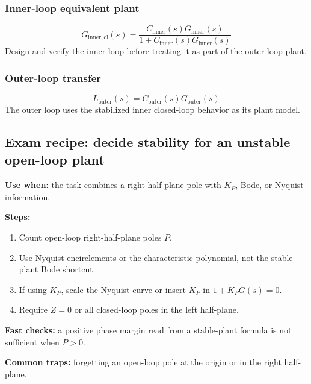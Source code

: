 \subsubsection{Inner-loop equivalent plant}
\[
G_{\mathrm{inner,cl}}(s)=\frac{C_{\mathrm{inner}}(s)G_{\mathrm{inner}}(s)}
{1+C_{\mathrm{inner}}(s)G_{\mathrm{inner}}(s)}
\]
Design and verify the inner loop before treating it as part of the outer-loop plant.

\subsubsection{Outer-loop transfer}
\[
L_{\mathrm{outer}}(s)=C_{\mathrm{outer}}(s)G_{\mathrm{outer}}(s)
\]
The outer loop uses the stabilized inner closed-loop behavior as its plant model.

\subsection{Exam recipe: decide stability for an unstable open-loop plant}

\textbf{Use when:} the task combines a right-half-plane pole with \(K_P\), Bode, or Nyquist information.

\textbf{Steps:}
\begin{enumerate}
\item Count open-loop right-half-plane poles \(P\).
\item Use Nyquist encirclements or the characteristic polynomial, not the stable-plant Bode shortcut.
\item If using \(K_P\), scale the Nyquist curve or insert \(K_P\) in \(1+K_PG(s)=0\).
\item Require \(Z=0\) or all closed-loop poles in the left half-plane.
\end{enumerate}

\textbf{Fast checks:} a positive phase margin read from a stable-plant formula is not sufficient when \(P>0\).

\textbf{Common traps:} forgetting an open-loop pole at the origin or in the right half-plane.
